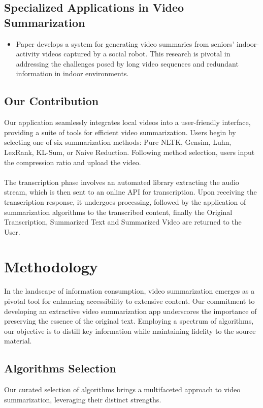 \documentclass{ieeeaccess}
\begin{document}
\subsection{Specialized Applications in Video Summarization}
\begin{itemize}
    \item Paper \cite{ref10} develops a system for generating video summaries from seniors' indoor-activity videos captured by a social robot. This research is pivotal in addressing the challenges posed by long video sequences and redundant information in indoor environments.
\end{itemize}

\subsection{Our Contribution}
Our application seamlessly integrates local videos into a user-friendly interface, providing a suite of tools for efficient video summarization. Users begin by selecting one of six summarization methods: Pure NLTK, Gensim, Luhn, LexRank, KL-Sum, or Naive Reduction. Following method selection, users input the compression ratio and upload the video.
\\\\The transcription phase involves an automated library extracting the audio stream, which is then sent to an online API for transcription. Upon receiving the transcription response, it undergoes processing, followed by the application of summarization algorithms to the transcribed content, finally the Original Transcription, Summarized Text and Summarized Video are returned to the User.


\section{Methodology}
In the landscape of information consumption, video summarization emerges as a pivotal tool for enhancing accessibility to extensive content. Our commitment to developing an extractive video summarization app underscores the importance of preserving the essence of the original text. Employing a spectrum of algorithms, our objective is to distill key information while maintaining fidelity to the source material.

\subsection{Algorithms Selection}
Our curated selection of algorithms brings a multifaceted approach to video summarization, leveraging their distinct strengths\cite{textsummarization}.
\end{document}
